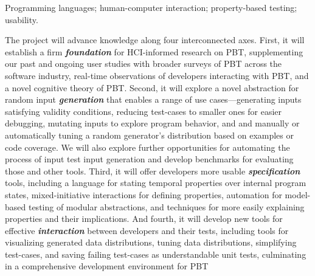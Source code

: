 \smallskip

 Programming languages; human-computer
interaction; property-based testing; usability.

The project will advance knowledge along four
\iflater {} \fi
interconnected axes.
%
First, it will establish a firm {\bf\em foundation} for HCI-informed
research on PBT, supplementing our past and ongoing user studies with
broader surveys of PBT across the software industry, real-time
observations of developers interacting with PBT, and a novel cognitive
theory of PBT.
%
Second, it will explore a novel abstraction for random input {\bf\em
generation} that enables a range of use cases---generating inputs
satisfying validity conditions, reducing test-cases to smaller ones for easier
debugging,
mutating inputs to explore program behavior, and
and manually or automatically tuning a random
generator's distribution based on examples or code coverage. We will also
explore further opportunities for automating the process of input test input
generation and develop benchmarks for evaluating those and other tools.
%
Third, it will offer developers more usable {\bf\em specification} tools,
including a language for stating temporal properties over internal
program states, mixed-initiative interactions for defining properties,
automation for model-based testing of
modular abstractions, and techniques for more easily explaining properties and
their implications.
%
And fourth, it will develop new tools for effective {\bf\em
  interaction} between developers and their tests, including tools for
visualizing generated data
distributions, tuning data distributions, simplifying test-cases, and saving
  failing test-cases as understandable unit tests, culminating in a
  comprehensive development environment for PBT


